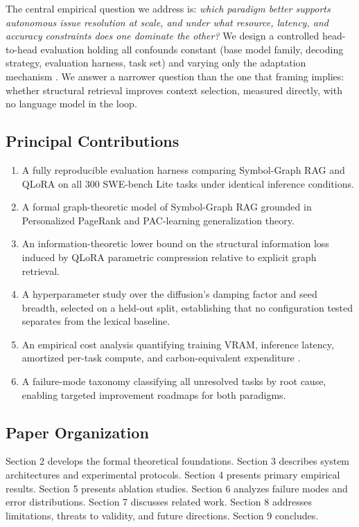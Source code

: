 \documentclass[10pt,twocolumn,letterpaper]{article}
\begin{document}
The central empirical question we address is: \textit{which paradigm better supports autonomous issue resolution at scale, and under what resource, latency, and accuracy constraints does one dominate the other?} We design a controlled head-to-head evaluation holding all confounds constant (base model family, decoding strategy, evaluation harness, task set) and varying only the adaptation mechanism \cite{arxiv_2203_11171}. We answer a narrower question than the one that framing implies: whether structural retrieval improves context selection, measured directly, with no language model in the loop.


\subsection{Principal Contributions}


\begin{enumerate}
  \item A fully reproducible evaluation harness comparing Symbol-Graph RAG and QLoRA on all 300 SWE-bench Lite tasks under identical inference conditions.
  \item A formal graph-theoretic model of Symbol-Graph RAG grounded in Personalized PageRank and PAC-learning generalization theory.
  \item An information-theoretic lower bound on the structural information loss induced by QLoRA parametric compression relative to explicit graph retrieval.
  \item A hyperparameter study over the diffusion's damping factor and seed breadth, selected on a held-out split, establishing that no configuration tested separates from the lexical baseline.
  \item An empirical cost analysis quantifying training VRAM, inference latency, amortized per-task compute, and carbon-equivalent expenditure \cite{arxiv_2406_00584}.
  \item A failure-mode taxonomy classifying all unresolved tasks by root cause, enabling targeted improvement roadmaps for both paradigms.
\end{enumerate}


\subsection{Paper Organization}


Section 2 develops the formal theoretical foundations. Section 3 describes system architectures and experimental protocols. Section 4 presents primary empirical results. Section 5 presents ablation studies. Section 6 analyzes failure modes and error distributions. Section 7 discusses related work. Section 8 addresses limitations, threats to validity, and future directions. Section 9 concludes.
\end{document}
